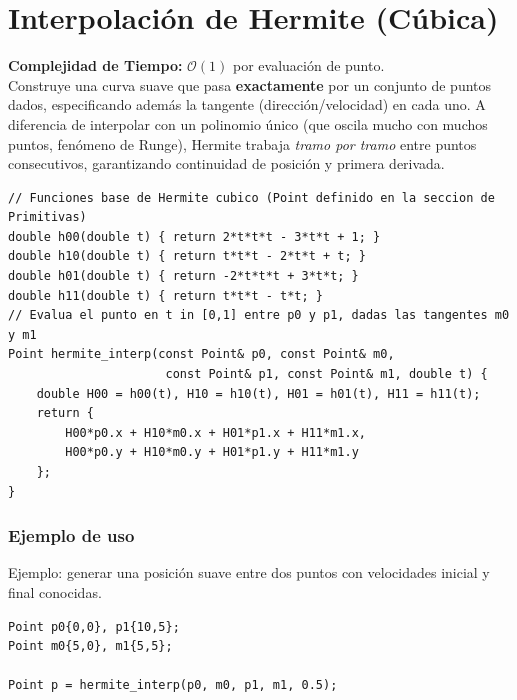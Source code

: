 \documentclass[10pt,twocolumn,letterpaper]{report}
\begin{document}
\section{Interpolación de Hermite (Cúbica)}
\textbf{Complejidad de Tiempo:} $\mathcal{O}(1)$ por evaluación de punto. \\
Construye una curva suave que pasa \textbf{exactamente} por un conjunto de puntos dados, especificando además la tangente (dirección/velocidad) en cada uno. A diferencia de interpolar con un polinomio único (que oscila mucho con muchos puntos, fenómeno de Runge), Hermite trabaja \textit{tramo por tramo} entre puntos consecutivos, garantizando continuidad de posición y primera derivada.
\begin{lstlisting}
// Funciones base de Hermite cubico (Point definido en la seccion de Primitivas)
double h00(double t) { return 2*t*t*t - 3*t*t + 1; }
double h10(double t) { return t*t*t - 2*t*t + t; }
double h01(double t) { return -2*t*t*t + 3*t*t; }
double h11(double t) { return t*t*t - t*t; }
// Evalua el punto en t in [0,1] entre p0 y p1, dadas las tangentes m0 y m1
Point hermite_interp(const Point& p0, const Point& m0,
                      const Point& p1, const Point& m1, double t) {
    double H00 = h00(t), H10 = h10(t), H01 = h01(t), H11 = h11(t);
    return {
        H00*p0.x + H10*m0.x + H01*p1.x + H11*m1.x,
        H00*p0.y + H10*m0.y + H01*p1.y + H11*m1.y
    };
}
\end{lstlisting}
\subsubsection*{Ejemplo de uso}
Ejemplo: generar una posición suave entre dos puntos con velocidades inicial y final conocidas.
\begin{lstlisting}
Point p0{0,0}, p1{10,5};
Point m0{5,0}, m1{5,5};

Point p = hermite_interp(p0, m0, p1, m1, 0.5);
\end{lstlisting}
\end{document}
